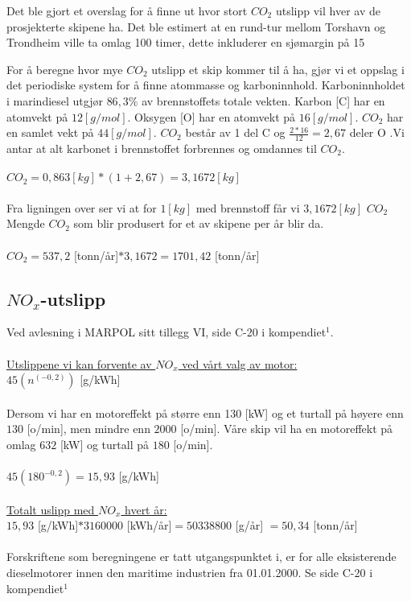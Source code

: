\documentclass[norsk]{article}
\begin{document}
Det ble gjort et overslag for å finne ut hvor stort $CO_2$ utslipp vil hver av de prosjekterte skipene ha. Det ble estimert at en rund-tur mellom Torshavn og Trondheim ville ta omlag 100 timer, dette inkluderer en sjømargin på 15%

For å beregne hvor mye $CO_2$ utslipp et skip kommer til å ha, gjør vi et oppslag i det periodiske system for å finne atommasse og karboninnhold. Karboninnholdet i marindiesel utgjør $86,3\% $ av brennstoffets totale vekten. Karbon [C] har en atomvekt på $12 [g/mol]$. Oksygen [O] har en atomvekt på $16 [g/mol]$. $CO_2$ har en samlet vekt på $44 [g/mol]$. $CO_2$ består av 1 del C og $\frac{2*16}{12} = 2,67$ deler O .Vi antar at alt karbonet i brennstoffet  forbrennes og omdannes til $CO_2$.
\\\\
$CO_2 = 0,863 [kg] * (1+2,67) = 3,1672 [kg]$
\\\\
Fra ligningen over ser vi at for $1 [kg]$ med brennstoff får vi $3,1672[kg]$   $CO_2$
\\
Mengde $CO_2$ som blir produsert for et av skipene per år blir da.
\\\\
$CO_2 = 537,2$ [tonn/år]$ * 3,1672  = 1701,42$ [tonn/år]

	\subsection{$NO_x$-utslipp}	
Ved avlesning i MARPOL sitt tillegg VI, side C-20 i kompendiet$^1$.
\\\\
\underline{Utslippene vi kan forvente av $NO_x$ ved vårt valg av motor:}
\\
$45(n^{(-0,2)})$ [g/kWh]
\\\\
Dersom vi har en motoreffekt på større enn 130 [kW] og et turtall på høyere enn $130$ [o/min], men mindre enn $2000$ [o/min].
Våre skip vil ha en motoreffekt på omlag $632$ [kW] og turtall på $180$ [o/min].
\\\\
$45(180^{-0,2})= 15,93$ [g/kWh] 
\\\\
\underline{Totalt uslipp med $NO_x$ hvert år:}
\\
$15,93$ [g/kWh]$ * 3160000$ [kWh/år]$ = 50338800$ [g/år] $ = 50,34$ [tonn/år]
\\\\
Forskriftene som beregningene er tatt utgangspunktet i, er for alle eksisterende dieselmotorer innen den maritime industrien fra 01.01.2000. Se side C-20 i kompendiet$^1$
\end{document}
